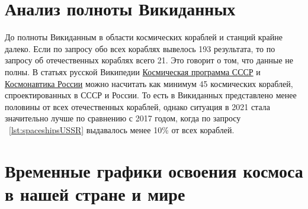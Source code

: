 \section{Анализ полноты Викиданных}
До полноты Викиданным в области космических кораблей и станций крайне далеко. Если по запросу обо всех кораблях вывелось 193 результата, то по запросу об отечественных кораблях всего 21. Это говорит о том, что данные не полны. В статьях русской Википедии \href{https://ru.wikipedia.org/wiki/%D0%9A%D0%BE%D1%81%D0%BC%D0%B8%D1%87%D0%B5%D1%81%D0%BA%D0%B0%D1%8F_%D0%BF%D1%80%D0%BE%D0%B3%D1%80%D0%B0%D0%BC%D0%BC%D0%B0_%D0%A1%D0%A1%D0%A1%D0%A0}{Космическая программа СССР} и \href{https://ru.wikipedia.org/wiki/%D0%9A%D0%BE%D1%81%D0%BC%D0%BE%D0%BD%D0%B0%D0%B2%D1%82%D0%B8%D0%BA%D0%B0_%D0%A0%D0%BE%D1%81%D1%81%D0%B8%D0%B8}{Космонавтика России} можно насчитать как минимум 45 космических кораблей, спроектированных в СССР и России. То есть в Викиданных представлено менее половины от всех отечественных кораблей, однако ситуация в 2021 стала значительно лучше по сравнению с 2017 годом, когда по запросу ~\ref{lst:spaceshipsUSSR} выдавалось менее 10\% от всех кораблей. 

\section{Временные графики освоения космоса в нашей стране и мире}


